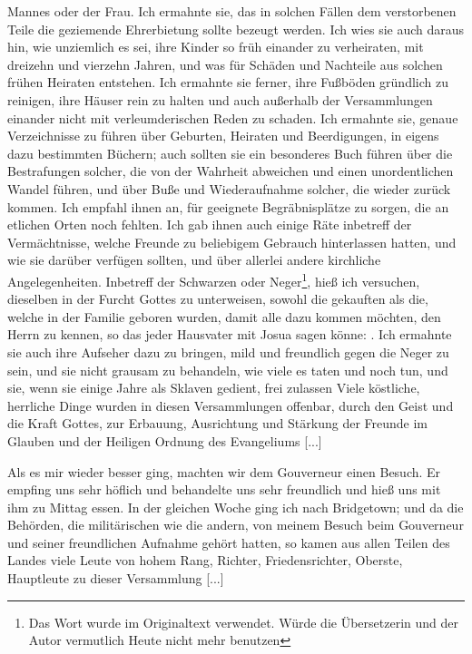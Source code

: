 Mannes oder der Frau. Ich ermahnte sie, das in solchen Fällen
dem verstorbenen Teile die geziemende Ehrerbietung sollte bezeugt
werden. Ich wies sie auch daraus hin, wie unziemlich es sei,
ihre Kinder so früh einander zu verheiraten, mit dreizehn und
vierzehn Jahren, und was für Schäden und Nachteile aus solchen
frühen Heiraten entstehen. Ich ermahnte sie ferner, ihre 
Fußböden gründlich zu reinigen, ihre Häuser rein zu halten und auch
außerhalb der Versammlungen einander nicht mit verleumderischen
Reden zu schaden. Ich ermahnte sie, genaue Verzeichnisse 
zu führen über Geburten, Heiraten und 
Beerdigungen,
in eigens dazu bestimmten Büchern; auch sollten sie ein 
besonderes Buch führen über die Bestrafungen
solcher, die von der Wahrheit abweichen und einen unordentlichen Wandel führen,
und über Buße und Wiederaufnahme solcher, die wieder zurück
kommen. Ich empfahl ihnen an, für geeignete Begräbnisplätze
zu sorgen, die an etlichen Orten noch fehlten. Ich gab ihnen
auch einige Räte inbetreff der Vermächtnisse, welche Freunde zu
beliebigem Gebrauch hinterlassen hatten, und wie sie darüber
verfügen sollten, und über allerlei andere kirchliche Angelegenheiten.
Inbetreff der Schwarzen oder Neger\footnote{Das Wort  wurde
im Originaltext verwendet. Würde die Übersetzerin und der Autor vermutlich 
Heute nicht mehr benutzen}, hieß ich versuchen, 
dieselben in der Furcht Gottes zu unterweisen, sowohl die gekauften
als die, welche in der Familie geboren wurden, damit alle dazu
kommen möchten, den Herrn zu kennen, so das jeder Hausvater
mit Josua sagen könne: . Ich ermahnte sie auch ihre Aufseher dazu zu
bringen, mild und freundlich gegen die Neger zu sein, und sie
nicht grausam zu behandeln, wie viele es taten und noch tun,
und sie, wenn sie einige Jahre als Sklaven gedient, frei zulassen
Viele köstliche, herrliche Dinge wurden in diesen Versammlungen
offenbar, durch den Geist und die Kraft Gottes, zur Erbauung,
Ausrichtung und Stärkung der Freunde im Glauben und der
Heiligen Ordnung des Evangeliums [...]

Als es mir wieder besser ging, machten wir dem 
Gouverneur
einen Besuch. Er empfing uns sehr höflich und behandelte 
uns sehr freundlich und hieß uns mit ihm zu Mittag essen. In der
gleichen Woche ging ich nach Bridgetown; und da die Behörden,
die militärischen wie die andern, von meinem Besuch beim Gouverneur 
und seiner freundlichen Aufnahme gehört hatten, so kamen
aus allen Teilen des Landes viele Leute von hohem Rang,
Richter, Friedensrichter, Oberste, Hauptleute zu dieser 
Versammlung [...] 

